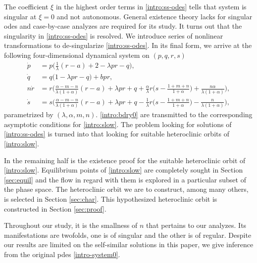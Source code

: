 \documentclass[a4paper,11pt]{article}
\begin{document}
The coefficient $\xi$ in the highest order terms in \eqref{intro:ss-odes} tells that system is  singular at $\xi=0$ and not autonomous. General existence theory lacks for singular odes and case-by-case analyzes are required for its study. It turns out that the singularity in \eqref{intro:ss-odes} is resolved. We introduce series of nonlinear transformations to de-singularize \eqref{intro:ss-odes}. In its final form, we arrive at the following four-dimensional dynamical system on $(p,q,r,s)$
\begin{equation}\label{intro:slow}
 \begin{aligned}
 \dot{p} &=p\Big(\frac{1}{\lambda}(r-a) + 2- \lambda p r -q\Big), \\
 \dot{q} &=q\Big(1 -\lambda p r -q\Big) + b p r,\\
 n\dot{r} &=r\Big(\frac{\alpha-m-n}{\lambda(1+\alpha)}(r-a) + \lambda pr + q +\frac{\alpha}{\lambda}r\big(s- \frac{1+m+n}{1+\alpha}\big) + \frac{n\alpha}{\lambda(1+\alpha)}\Big),\\
 \dot{s} &=s\Big(\frac{\alpha-m-n}{\lambda(1+\alpha)}(r-a) + \lambda pr + q - \frac{1}{\lambda}r\big(s- \frac{1+m+n}{1+\alpha}\big) - \frac{n}{\lambda(1+\alpha)}\Big),
 \end{aligned}
\end{equation}
parametrized by $(\lambda,\alpha,m,n)$. \eqref{intro:bdry0} are transmitted to the corresponding asymptotic conditions for \eqref{intro:slow}. The problem looking for solutions of \eqref{intro:ss-odes} is turned into that looking for suitable heteroclinic orbits of \eqref{intro:slow}. 

In the remaining half is the existence proof for the suitable heteroclinic orbit of \eqref{intro:slow}. %
Equilibrium points of \eqref{intro:slow} are completely sought in Section \ref{sec:equil} and the flow in regard with them is explored in a particular subset of the phase space. The heteroclinic orbit we are to construct, among many others, is selected in Section \ref{sec:char}. This hypothesized heteroclinic orbit is constructed in Section \ref{sec:proof}.

Throughout our study, it is the smallness of $n$ that pertains to our analyzes. Its manifestations are twofolds, one is of singular and the other is of regular. Despite our results are limited on the self-similar solutions in this paper, we give inference from the original pdes \eqref{intro-system0}.
\end{document}
